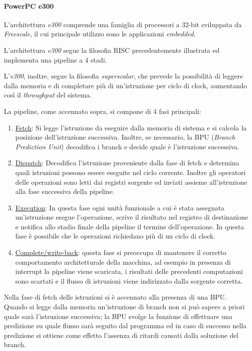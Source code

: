 \paragraph{PowerPC e300}
L'architettura \textit{e300} comprende una famiglia di processori a $32$-bit sviluppata da \textit{Freescale}, il cui principale utilizzo sono le applicazioni \textit{embedded}.

L'architettura \textit{e300} segue la filosofia RISC precedentemente illustrata ed implementa una pipeline a $4$ stadi. 

L'\textit{e300}, inoltre, segue la filosofia \textit{superscalar}, che prevede la possibilità di leggere dalla memoria e di completare più di un'istruzione per ciclo di clock, aumentando così il \textit{throughput} del sistema.

La pipeline, come accennato sopra, si compone di 4 fasi principali:

\begin{enumerate}
	\item \underline{Fetch}: Si legge l'istruzione da eseguire dalla memoria di sistema e si calcola la posizione dell'istruzione successiva. Inoltre, se necessario, la BPU (\textit{Branch Prediction Unit}) decodifica i branch e decide quale è l'istruzione successiva.
	\item \underline{Dispatch}: Decodifica l'istruzione proveniente dalla fase di fetch e determina quali istruzioni possono essere eseguite nel ciclo corrente. Inoltre gli operatori delle operazioni sono letti dai registri sorgente ed inviati assieme all'istruzione alla fase successiva della pipeline.
	\item \underline{Execution}: In questa fase ogni unità funzionale a cui è stata assegnata un'istruzione esegue l'operazione, scrive il risultato nel registro di destinazione e notifica allo stadio finale della pipeline il termine dell'operazione. In questa fase è possibile che le operazioni richiedano più di un ciclo di clock.
	\item \underline{Complete/write-back}: questa fase si preoccupa di mantenere il corretto comportamento architetturale della macchina, ad esempio in presenza di interrupt la pipeline viene scaricata, i risultati delle precedenti computazioni sono scartati e il flusso di istruzioni viene indirizzato dalla sorgente corretta.
\end{enumerate}

Nella fase di fetch delle istruzioni si è accennato alla presenza di una BPU. Quando si legge dalla memoria un'istruzione di branch non si può sapere a priori quale sarà l'istruzione successiva; la BPU svolge la funzione di effettuare una predizione su quale flusso sarà seguito dal programma ed in caso di successo nella predizione si ottiene come effetto l'assenza di ritardi causati dalla soluzione del branch.

